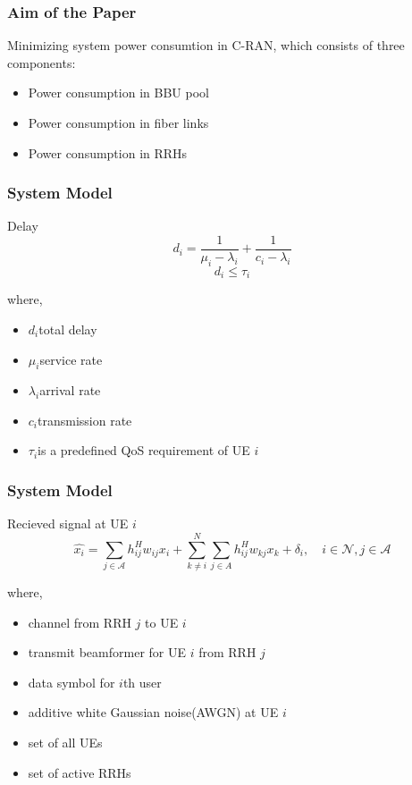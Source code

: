 \documentclass[usenames,dvipsnames]{beamer}
\begin{document}
\begin{frame}
  \frametitle{Aim of the Paper}
  Minimizing system power consumtion in C-RAN, which consists of three components:
  \begin{itemize}
  \item Power consumption in BBU pool
  \item Power consumption in fiber links
  \item Power consumption in RRHs
  \end{itemize}
\end{frame}
\begin{frame}
  \frametitle{System Model}
  \begin{exampleblock}{Delay}
    \[
      d_{i} = \frac{1}{\mu_{i}- \lambda_{i}} + \frac{1}{c_{i} - \lambda_{i}}
    \]
    \[
      d_{i}\leq\tau_{i}
    \]
  \end{exampleblock}
  where,
  \begin{itemize}
    \item  $d_{i}$\quad total delay
    \item $\mu_{i}$\quad service rate
    \item $\lambda_{i}$\quad arrival rate
    \item $c_{i}$\quad transmission rate
    \item $\tau_{i}$\quad is a predefined QoS requirement of UE $i$
  \end{itemize}
\end{frame}
\begin{frame}
  \frametitle{System Model}
  \begin{exampleblock}{Recieved signal at UE $i$}
    \[
      \hat{x_{i}} = \sum_{j\in{\mathcal{A}}}^{}h_{ij}^{H}w_{ij}x_{i} + \sum_{k\neq i}^{N}\sum_{j\in{A}}^{}h_{ij}^{H}w_{kj}x_{k} + \delta_{i},\quad i\in\mathcal{N}, j\in\mathcal{A}
    \]
  \end{exampleblock}
  where,
  \begin{itemize}
    \item { channel from RRH $j$ to UE $i$}
    \item { transmit beamformer for UE $i$ from RRH $j$}
    \item { data symbol for $i$th user}
    \item { additive white Gaussian noise(AWGN) at UE $i$}
    \item { set of all UEs}
    \item { set of active RRHs}
  \end{itemize}
\end{frame}
\end{document}
